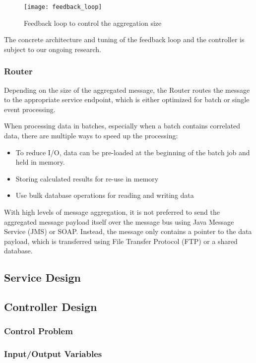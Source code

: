 \begin{figure}[htbp]
	\centering
	\texttt{[image: feedback\_loop]}
	\caption{Feedback loop to control the aggregation size}
	\label{fig:feedback_loop}
\end{figure}
The concrete architecture and tuning of the feedback loop and the controller is subject to our ongoing research.
\subsubsection{Router}
Depending on the size of the aggregated message, the Router routes the message to the appropriate service endpoint, which is either optimized for batch or single event processing.

When processing data in batches, especially when a batch contains correlated data, there are multiple ways to speed up the processing:
\begin{itemize}
	\item To reduce I/O, data can be pre-loaded at the beginning of the batch job and held in memory.
	\item Storing calculated results for re-use in memory
	\item Use bulk database operations for reading and writing data
\end{itemize}

With high levels of message aggregation, it is not preferred to send the aggregated message payload itself over the message bus using Java Message Service (JMS) or SOAP. Instead, the message only contains a pointer to the data payload, which is transferred using File Transfer Protocol (FTP) or a shared database.

\subsection{Service Design}

\subsection{Controller Design}

\subsubsection{Control Problem}

\subsubsection{Input/Output Variables}

